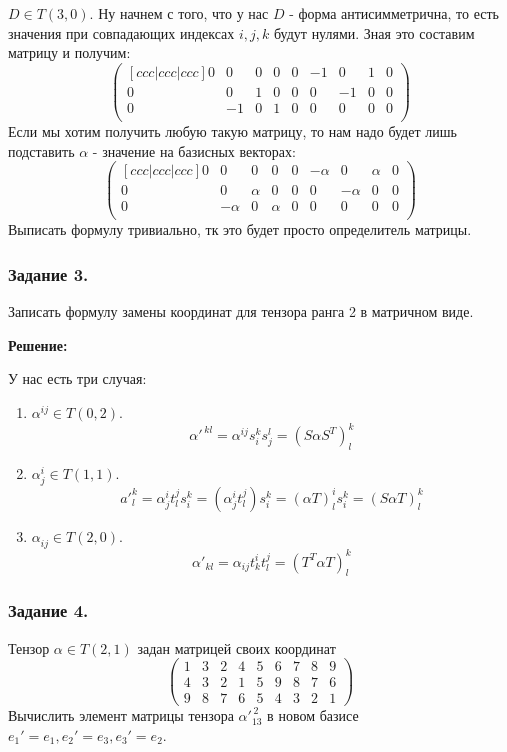 $D \in T(3,0)$. Ну начнем с того, что у нас $D$ - форма антисимметрична, то есть значения  при совпадающих индексах $i,j,k$ будут нулями. Зная это составим матрицу и получим:
$$\begin{pmatrix}[ccc|ccc|ccc]
    0 & 0 & 0 & 0 & 0 & -1 & 0& 1& 0 \\
    0 & 0 & 1 & 0 & 0 & 0 & -1 & 0 & 0 \\
    0 & -1 & 0 & 1 & 0 & 0 & 0 & 0 & 0 \\
\end{pmatrix}$$
Если мы хотим получить любую такую матрицу, то нам надо будет лишь подставить $\alpha$ - значение на базисных векторах:
$$\begin{pmatrix}[ccc|ccc|ccc]
    0 & 0 & 0 & 0 & 0 & -\alpha & 0& \alpha& 0 \\
    0 & 0 & \alpha & 0 & 0 & 0 & -\alpha & 0 & 0 \\
    0 & -\alpha & 0 & \alpha & 0 & 0 & 0 & 0 & 0 \\
\end{pmatrix}$$
Выписать формулу тривиально, тк это будет просто определитель матрицы.

\subsubsection{Задание 3.}

Записать формулу замены координат для тензора ранга 2 в матричном виде.

\textbf{Решение:}

У нас есть три случая:
\begin{enumerate}
    \item $\alpha^{ij} \in T(0,2)$.
    $$\alpha'^{\,kl}= \alpha^{ij} s^{k} _i s^l_j = (S\alpha S^T)^k_l$$
    \item $\alpha^{i}_j \in T(1,1)$.
     $$a'^k_l = \alpha^i_j t^j_l s^k_i= (\alpha^i_j t_l^j)s_i^k = (\alpha T)^i_l s^k_i = (S\alpha T)^k_l$$
    \item $\alpha^{}_{ij} \in T(2,0)$. 
    $$\alpha'_{kl} =\alpha_{ij}t_k^i t_l^j=(T^T \alpha T)^k_l$$
\end{enumerate}

\subsubsection{Задание 4.}

Тензор $\alpha \in T(2,1)$ задан матрицей своих координат
$$\begin{pmatrix}
    1 &3 & 2 &4 & 5 &6 & 7 & 8 & 9 \\
    4 &3&2 &1 &5 & 9 & 8 & 7  & 6\\
    9 & 8 & 7 & 6  & 5 & 4 &3 & 2 &1
\end{pmatrix}$$
Вычислить элемент матрицы тензора $\alpha'^{\, 2}_{13}$ в новом базисе $e_1' = e_1,e_2' = e_3, e_3'=e_2$.

